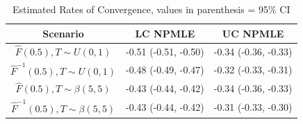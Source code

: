 	
\begin{table}[H]
	
\label{EstConRates}
		
\begin{center}

\begin{small}	


\caption[Test]{Estimated Rates of Convergence, values in parenthesis = 95\% CI}

\vspace{1mm} 
\begin{tabular} {| c | c | c |} 


	\hline	
		
	Scenario							& 	LC NPMLE 		& 	UC NPMLE  \\
	\hline	
	
$\hat F(0.5), T\sim U(0,1)$		&	-0.51 (-0.51, -0.50)	&	-0.34 (-0.36, -0.33) \\


$\hat F^{-1}(0.5), T\sim U(0,1)$	&	-0.48 (-0.49, -0.47)	&	-0.32 (-0.33, -0.31) \\
	
	\hline
	
$\hat F(0.5), T\sim \beta(5,5)$		&	-0.43 (-0.44, -0.42)	&	-0.34 (-0.36, -0.33) \\


$\hat F^{-1}(0.5), T\sim \beta(5,5)$	&	-0.43 (-0.44, -0.42)	&	-0.31 (-0.33, -0.30) \\
	
	\hline	
\end{tabular}
\end{small}
\end{center}


\end{table}
	





